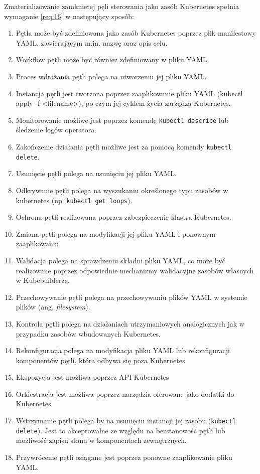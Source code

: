 Zmaterializowanie zamknietej pęli sterowania jako zasób Kubernetes spełnia wymaganie \ref{req:16} w następujący sposób:
\begin{enumerate}[label=Fx.\arabic*] %
    \item Pętla może być zdefiniowana jako zasób Kubernetes poprzez plik manifestowy YAML, zawierającym m.in. nazwę oraz opis celu.
    \item Workflow pętli może być również zdefiniowany w pliku YAML.
    \item Proces wdrażania pętli polega na utworzeniu jej pliku YAML.
    \item Instancja pętli jest tworzona poprzez zaaplikowanie pliku YAML (kubectl apply -f <filename>), po czym jej cyklem życia zarządza Kubernetes.
    \item Monitorowanie możliwe jest poprzez komendę \texttt{kubectl describe} lub śledzenie logów operatora.
    \item Zakończenie działania pętli możliwe jest za pomocą komendy \texttt{kubectl delete}.
    \item Usunięcie pętli polega na usunięciu jej pliku YAML.
    \item Odkrywanie pętli polega na wyszukaniu określonego typu zasobów w kubernetes (np. \texttt{kubectl get loops}).
    \item Ochrona pętli realizowana poprzez zabezpieczenie klastra Kubernetes.
    \item Zmiana pętli polega na modyfikacji jej pliku YAML i ponownym zaaplikowaniu. 
    \item Walidacja polega na sprawdzeniu składni pliku YAML, co może być realizowane poprzez odpowiednie mechanizmy walidacyjne zasobów własnych w Kubebuilderze.
    \item Przechowywanie pętli polega na przechowywaniu plików YAML w systemie plików (ang. \textit{filesystem}).
    \item Kontrola pętli polega na działaniach utrzymaniowych analogicznych jak w przypadku zasobów wbudowanych Kubernetes.
    \item Rekonfiguracja polega na modyfikacja pliku YAML lub rekonfiguracji komponentów pętli, która odbywa się poza Kubernetes
    \item Ekspozycja jest możliwa poprzez API Kubernetes
    \item Orkiestracja jest możliwa poprzez narzędzia oferowane jako dodatki do Kubernetes
    \item Wstrzymanie pętli polega by na usunięciu instancji jej zasobu (\texttt{kubectl delete}). Jest to akceptowalne ze względu na bezstanowość pętli lub możliwość zapisu stanu w komponentach zewnętrznych.
    \item Przywrócenie pętli osiągane jest poprzez ponowne zaaplikowanie pliku YAML.
\end{enumerate}
 
